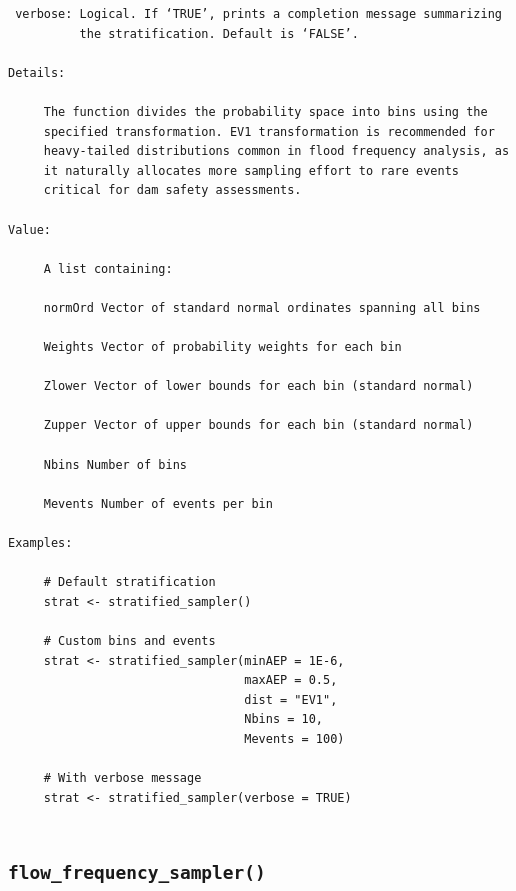 \documentclass[
  letterpaper,
  DIV=11,
  numbers=noendperiod]{scrreprt}
\begin{document}
\begin{verbatim}
 verbose: Logical. If ‘TRUE’, prints a completion message summarizing
          the stratification. Default is ‘FALSE’.

Details:

     The function divides the probability space into bins using the
     specified transformation. EV1 transformation is recommended for
     heavy-tailed distributions common in flood frequency analysis, as
     it naturally allocates more sampling effort to rare events
     critical for dam safety assessments.

Value:

     A list containing:

     normOrd Vector of standard normal ordinates spanning all bins

     Weights Vector of probability weights for each bin

     Zlower Vector of lower bounds for each bin (standard normal)

     Zupper Vector of upper bounds for each bin (standard normal)

     Nbins Number of bins

     Mevents Number of events per bin

Examples:

     # Default stratification
     strat <- stratified_sampler()
     
     # Custom bins and events
     strat <- stratified_sampler(minAEP = 1E-6,
                                 maxAEP = 0.5,
                                 dist = "EV1",
                                 Nbins = 10,
                                 Mevents = 100)
     
     # With verbose message
     strat <- stratified_sampler(verbose = TRUE)
     
\end{verbatim}

\subsection{\texorpdfstring{\texttt{flow\_frequency\_sampler()}}{flow\_frequency\_sampler()}}\label{flow_frequency_sampler}
\end{document}
